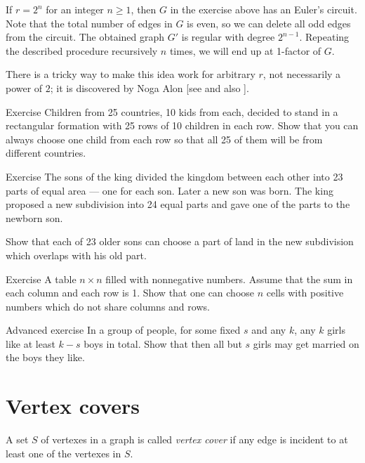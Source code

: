 If $r=2^n$ for an integer $n\ge 1$, then $G$ in the exercise above has an Euler's circuit. 
Note that the total number of edges in $G$ is even, so we can delete all odd edges from the circuit.
The obtained graph $G'$ is regular with degree $2^{n-1}$.
Repeating the described procedure recursively $n$ times, 
we will end up at 1-factor of $G$.

There is a tricky way to make this idea work for arbitrary $r$, not necessarily a power of $2$; 
it is discovered by Noga Alon [see  and also ]. 

\begin{thm}{Exercise}
Children from 25 countries, 10 kids from each, decided to stand in a rectangular formation with 25 rows of 10 children in each row.
Show that you can always choose one child from each row so that all 25 of them will be from different countries.
\end{thm}

\begin{thm}{Exercise}
The sons of the king divided the kingdom between each other into 23 parts of equal area --- one for each son.
Later a new son was born. 
The king proposed a new subdivision into 24 equal parts and gave one of the parts to the newborn son.

Show that each of 23 older sons can choose a part of land in the new subdivision which overlaps with his old part.
\end{thm}

\begin{thm}{Exercise} A table $n{\times}n$ filled with nonnegative numbers.
Assume that the sum in each column and each row is 1.
Show that one can choose $n$ cells with positive numbers which do not share columns and rows. 
\end{thm}


\begin{thm}{Advanced exercise}
In a group of people, for some fixed $s$ and any $k$,
any $k$ girls like at least $k-s$ boys in total.
Show that then all but $s$ girls may get married on the boys they like.
\end{thm}



\section*{Vertex covers}

A set $S$ of vertexes in a graph is called \emph{vertex cover} if any edge is incident to at least one of the vertexes in $S$.

